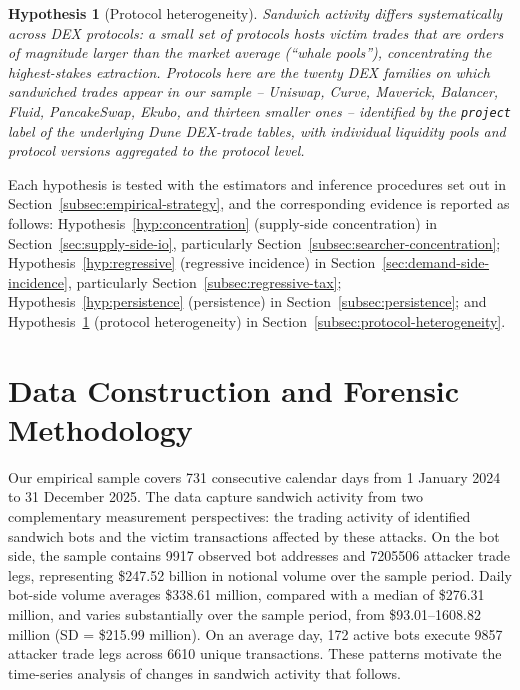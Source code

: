 \documentclass[pdflatex, sn-basic]{sn-jnl}
\theoremstyle{thmstylethree}%
\newtheorem{hypothesis}{Hypothesis}
\begin{document}
	\begin{hypothesis}[Protocol heterogeneity]
	\label{hyp:heterogeneity}
	Sandwich activity differs systematically across \ac{DEX} protocols: a small set of protocols hosts victim trades that are orders of magnitude larger than the market average (\enquote{whale pools}), concentrating the highest-stakes extraction.
	Protocols here are the twenty \ac{DEX} families on which sandwiched trades appear in our sample -- Uniswap, Curve, Maverick, Balancer, Fluid, PancakeSwap, Ekubo, and thirteen smaller ones -- identified by the \texttt{project} label of the underlying Dune \ac{DEX}-trade tables, with individual liquidity pools and protocol versions aggregated to the protocol level.
	\end{hypothesis}

    Each hypothesis is tested with the estimators and inference procedures set out in Section~\ref{subsec:empirical-strategy}, and the corresponding evidence is reported as follows: Hypothesis~\ref{hyp:concentration} (supply-side concentration) in Section~\ref{sec:supply-side-io}, particularly Section~\ref{subsec:searcher-concentration}; Hypothesis~\ref{hyp:regressive} (regressive incidence) in Section~\ref{sec:demand-side-incidence}, particularly Section~\ref{subsec:regressive-tax}; Hypothesis~\ref{hyp:persistence} (persistence) in Section~\ref{subsec:persistence}; and Hypothesis~\ref{hyp:heterogeneity} (protocol heterogeneity) in Section~\ref{subsec:protocol-heterogeneity}.


	\section{Data Construction and Forensic Methodology}
	\label{sec:data-methodology}

    Our empirical sample covers \num{731} consecutive calendar days from 1 January 2024 to 31 December 2025.
    The data capture sandwich activity from two complementary measurement perspectives: the trading activity of identified sandwich bots and the victim transactions affected by these attacks.
    On the bot side, the sample contains \num{9917} observed bot addresses and \num{7205506} attacker trade legs, representing \$\num{247.52} billion in notional volume over the sample period.
    Daily bot-side volume averages \$\num{338.61} million, compared with a median of \$\num{276.31} million, and varies substantially over the sample period, from \$\numrange{93.01}{1608.82} million (SD = \$\num{215.99} million).
    On an average day, \num{172} active bots execute \num{9857} attacker trade legs across \num{6610} unique transactions.
    These patterns motivate the time-series analysis of changes in sandwich activity that follows.
    
\end{document}
